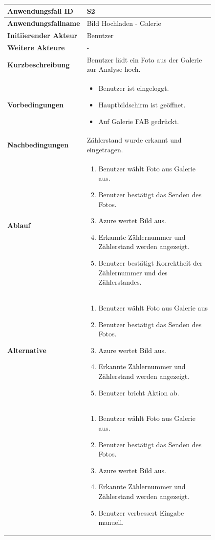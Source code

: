 \begin{figure}[H]
	\centering
	\begin{tabularx}{\textwidth}{ X | X }
		\textbf{Anwendungsfall ID} & S2 \\ \hline
		\textbf{Anwendungsfallname} & Bild Hochladen - Galerie \\ \hline
		\textbf{Initiierender Akteur} & Benutzer \\ \hline
		\textbf{Weitere Akteure} & - \\ \hline
		\textbf{Kurzbeschreibung} & Benutzer lädt ein Foto aus der Galerie zur Analyse hoch. \\ \hline
		\textbf{Vorbedingungen} &
		\begin {itemize}
			\item Benutzer ist eingeloggt.
			\item Hauptbildschirm ist geöffnet.
			\item Auf Galerie FAB gedrückt.
		\end{itemize}\\ \hline
		\textbf{Nachbedingungen} & Zählerstand wurde erkannt und eingetragen. \\ \hline
		\textbf{Ablauf} &
		\begin{enumerate}
			\item Benutzer wählt Foto aus Galerie aus.
			\item Benutzer bestätigt das Senden des Fotos. 
			\item Azure wertet Bild aus.
			\item Erkannte Zählernummer und Zählerstand werden angezeigt. 
			\item Benutzer bestätigt Korrektheit der Zählernummer und des Zählerstandes.
		\end{enumerate} \\ \hline
		\textbf{Alternative} & 
		\begin{enumerate}
			\item Benutzer wählt Foto aus Galerie aus
			\item Benutzer bestätigt das Senden des Fotos.
			\item Azure wertet Bild aus. 
			\item Erkannte Zählernummer und Zählerstand werden angezeigt. 
			\item Benutzer bricht Aktion ab. 
		\end{enumerate}
		\\&
		\begin{enumerate}
			\item Benutzer wählt Foto aus Galerie aus.
			\item Benutzer bestätigt das Senden des Fotos. 
			\item Azure wertet Bild aus.
			\item Erkannte Zählernummer und Zählerstand werden angezeigt. 
			\item Benutzer verbessert Eingabe manuell.
		\end{enumerate} \\
	\end{tabularx}
\end{figure}
